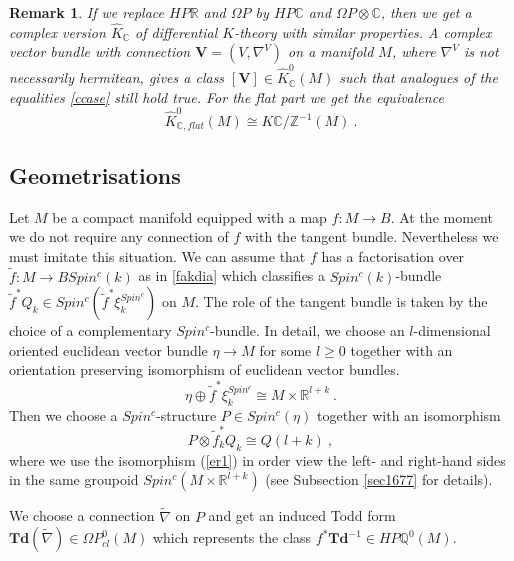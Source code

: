 \documentclass[12pt]{article}
\newtheorem{rem}[theorem]{Remark}
\newcommand{\Z}{{\mathbb{Z}}}
\newcommand{\Q}{{\mathbb{Q}}}
\newcommand{\R}{{\mathbb{R}}}
\newcommand{\C}{{\mathbb{C}}}
\newcommand{\Td}{{\mathbf{Td}}}
\newcommand{\bV}{{\mathbf{V}}}
\begin{document}
\begin{rem}\label{remark222}{\rm
If we replace $HP\R$ and $\Omega P$ by $HP\C$ and $\Omega P\otimes \C$, then we get a complex version $\hat K_{\C}$ of differential $K$-theory with similar properties. A complex vector bundle with connection $\bV=(V,\nabla^{V})$  on a manifold $M$, where $\nabla^{V}$ is not necessarily hermitean, gives a class $[\bV]\in \hat K^{0}_{\C}(M)$ such that analogues of the equalities \eqref{ccase} still hold true. For the flat part we get the equivalence
$$\hat K^{0}_{\C,flat}(M)\cong K\C/\Z^{-1}(M)\ .$$
}\end{rem}



\subsection{Geometrisations}\label{sec18555}

  
Let $M$ be a compact manifold equipped with a map $f:M\to B$.  At the moment we do not require any connection of $f$ with the tangent bundle. Nevertheless we must imitate this situation.
 We can assume that
$f$ has a factorisation over $\tilde f:M\to BSpin^{c}(k)$  as in \eqref{fakdia} which classifies a $Spin^{c}(k)$-bundle $\tilde f^{*}Q_{k}\in Spin^{c}(\tilde  f^{*}\xi^{Spin^{c}}_{k})$ on $M$. The role of the tangent bundle is taken by the choice of a complementary $Spin^{c}$-bundle. In detail, we choose an  $l$-dimensional oriented euclidean  vector  bundle $\eta\to M$ for some $l\ge 0$
  together with an orientation preserving isomorphism  of euclidean vector bundles.
  \begin{equation}\label{er1}\eta\oplus \tilde f^{*}\xi^{Spin^{c}}_{k}\cong M\times \R^{l+k}\ .\end{equation}
Then we choose a $Spin^{c}$-structure $P\in Spin^{c}(\eta)$ together with an isomorphism
$$P\otimes \tilde f_{k}^{*}Q_{k}\cong Q(l+k)\ ,$$ where we use
the isomorphism (\ref{er1}) in order view the left-  and right-hand  sides in the same groupoid $Spin^{c}(M\times \R^{l+k})$ (see Subsection  \ref{sec1677} for details).

  We choose a connection $\tilde \nabla$ on $P$
  and get an induced Todd form $\Td(\tilde \nabla)\in \Omega P_{cl}^{0}(M)$ which represents the class $f^{*}\Td^{-1}\in HP\Q^{0}(M)$.  
    
\end{document}
